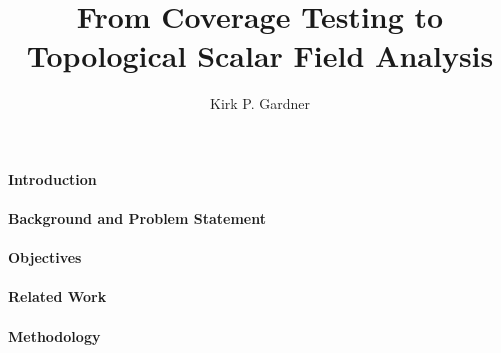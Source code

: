\documentclass[12pt]{article}
\title{From Coverage Testing to Topological Scalar Field Analysis}
\author{Kirk P. Gardner}
\begin{document}
\maketitle



\paragraph{Introduction}


% 

\paragraph{Background and Problem Statement}


\paragraph{Objectives}


\paragraph{Related Work}


\clearpage
\paragraph{Methodology}
% 




\end{document}
